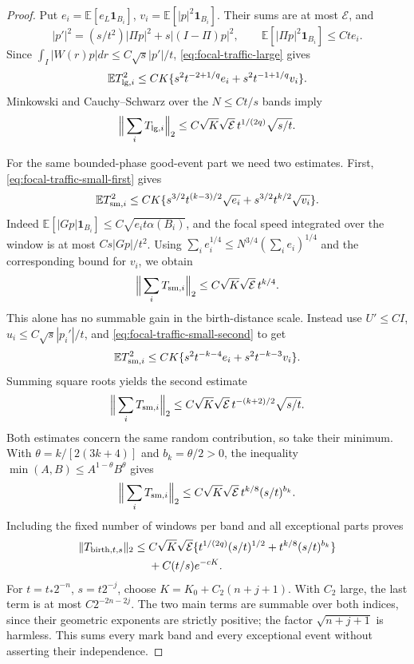 \documentclass[11pt,reqno]{amsart}
\theoremstyle{definition}
\theoremstyle{remark}
\numberwithin{equation}{section}
\newcommand{\E}{\mathbb E}
\begin{document}
\begin{proof}
Put $e_i=\E[e_L\mathbf1_{B_i}]$, $v_i=\E[|p|^2\mathbf1_{B_i}]$.
Their sums are at most $\mathcal E$, and
\[
 |p'|^2=(s/t^2)|\Pi p|^2+s|(I-\Pi)p|^2,
 \qquad \E[|\Pi p|^2\mathbf1_{B_i}]\le Ct e_i.
\]
Since $\int_I|W(r)p|dr\le C\sqrt{s}|p'|/t$,
\eqref{eq:focal-traffic-large} gives
\[
 \E T_{{\rm lg},i}^2
      \le CK\{s^2t^{-2+1/q}e_i+s^2t^{-1+1/q}v_i\}.
\]
Minkowski and Cauchy--Schwarz over the $N\le Ct/s$ bands imply
\begin{equation}\label{eq:focal-traffic-birth-large}
 \Big\|\sum_iT_{{\rm lg},i}\Big\|_2
      \le C\sqrt K\sqrt{\mathcal E}\,t^{1/(2q)}\sqrt{s/t}.
\end{equation}

For the same bounded-phase good-event part we need two estimates.
First, \eqref{eq:focal-traffic-small-first} gives
\[
 \E T_{{\rm sm},i}^2\le CK\{
 s^{3/2}t^{(k-3)/2}\sqrt{e_i}
             +s^{3/2}t^{k/2}\sqrt{v_i}\}.
\]
Indeed $\E[|Gp|\mathbf1_{B_i}]\le C\sqrt{e_i t\alpha(B_i)}$,
and the focal speed integrated over the window is at most $Cs|Gp|/t^2$.
Using $\sum_i e_i^{1/4}\le N^{3/4}(\sum_i e_i)^{1/4}$ and the
corresponding bound for $v_i$, we obtain
\begin{equation}\label{eq:focal-traffic-birth-first}
 \Big\|\sum_iT_{{\rm sm},i}\Big\|_2
                 \le C\sqrt K\sqrt{\mathcal E}\,t^{k/4}.
\end{equation}
This alone has no summable gain in the birth-distance scale.
Instead use $U'\le CI$, $u_i\le C\sqrt{s}|p_i'|/t$, and
\eqref{eq:focal-traffic-small-second} to get
\[
 \E T_{{\rm sm},i}^2
           \le CK\{s^2t^{-k-4}e_i+s^2t^{-k-3}v_i\}.
\]
Summing square roots yields the second estimate
\begin{equation}\label{eq:focal-traffic-birth-second}
 \Big\|\sum_iT_{{\rm sm},i}\Big\|_2
      \le C\sqrt K\sqrt{\mathcal E}\,t^{-(k+2)/2}\sqrt{s/t}.
\end{equation}
Both estimates concern the same random contribution, so take their
minimum. With $\theta=k/[2(3k+4)]$ and $b_k=\theta/2>0$, the inequality
$\min(A,B)\le A^{1-\theta}B^\theta$ gives
\[
 \Big\|\sum_iT_{{\rm sm},i}\Big\|_2
       \le C\sqrt K\sqrt{\mathcal E}\,t^{k/8}(s/t)^{b_k}.
\]
Including the fixed number of windows per band and all exceptional
parts proves
\begin{equation}\label{eq:focal-traffic-birth-sum}
 \begin{split}
 \|T_{{\rm birth},t,s}\|_2\le{}&
 C\sqrt K\sqrt{\mathcal E}
       \{t^{1/(2q)}(s/t)^{1/2}+t^{k/8}(s/t)^{b_k}\}\\
 &+C(t/s)e^{-cK}.
 \end{split}
\end{equation}
For $t=t_*2^{-n}$, $s=t2^{-j}$, choose
$K=K_0+C_2(n+j+1)$. With $C_2$ large, the last term is at most
$C2^{-2n-2j}$. The two main terms are summable over both indices,
since their geometric exponents are strictly positive; the factor
$\sqrt{n+j+1}$ is harmless. This sums every mark band and every
exceptional event without asserting their independence.


\end{proof}
\end{document}
